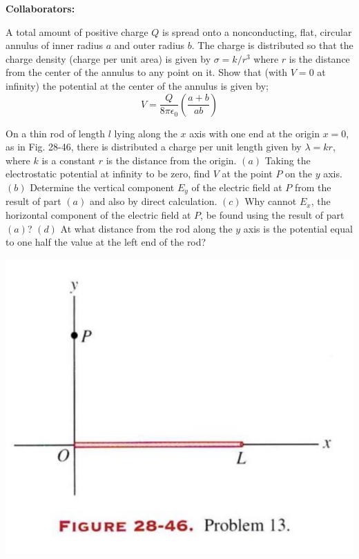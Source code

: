 \documentclass[11pt,letterpaper,boxed]{hmcpset}
\begin{document}
\noindent\textbf{Collaborators:} 


\begin{problem}
A total amount of positive charge $Q$ is spread onto a nonconducting, flat, circular annulus of inner radius $a$ and outer radius $b$. The charge is distributed so that the charge density (charge per unit area) is given by $\sigma = k/r^3$ where $r$ is the distance from the center of the annulus to any point on it. Show that (with $V=0$ at infinity) the potential at the center of the annulus is given by; 
$$ V= \frac{Q}{8\pi \epsilon_0}\left( \frac{a+b}{ab}\right)$$
\end{problem}

\begin{solution}
\vfill
\end{solution}
\newpage

\begin{problem}[HRK 28.13]
On a thin rod of length $l$ lying along the $x$ axis with one end at the origin $x=0$, as in Fig. 28-46, there is distributed a charge per unit length given by $\lambda =kr$, where $k$ is a constant $r$ is the distance from the origin. $(a)$ Taking the electrostatic potential at infinity to be zero, find $V$ at the point $P$ on the $y$ axis. $(b)$ Determine the vertical component $E_y$ of the electric field at $P$ from the result of part $(a)$ and also by direct calculation. $(c)$ Why cannot $E_x$, the horizontal component of the electric field at $P$, be found using the result of part $(a)$? $(d)$ At what distance from the rod along the  $y$ axis is the potential equal to one half the value at the left end of the rod?
\begin{center}
\includegraphics[scale=0.6]{28-46.png}
\end{center}
\end{problem}
\end{document}
